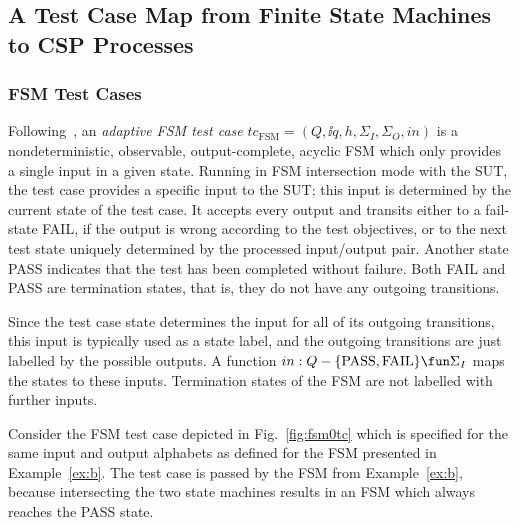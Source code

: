 \subsection{A Test Case Map from Finite State Machines to CSP Processes}
\label{sec:tcmap}

\subsubsection*{FSM Test Cases}

Following~\cite{DBLP:conf/hase/PetrenkoY14}, 
an \emph{adaptive FSM test case} $tc_\text{FSM}=(Q,\ii q,h,\Sigma_I,\Sigma_O,in)$ is a nondeterministic, observable, output-complete, acyclic FSM which only provides a single input in a given state. Running in FSM intersection mode with the SUT, the test case provides a specific input to the SUT; this input is determined by the current state of the test case. It accepts every output and transits either to a fail-state FAIL, if the output is wrong according to the test objectives, or to the next test state uniquely determined  by the processed input/output pair. Another state PASS indicates that
the test has been completed without failure. Both FAIL and PASS are termination states, that is, they do not have any outgoing transitions.

Since the test case state determines the input for all of its outgoing transitions, this input is typically used as a state label, and the outgoing transitions are just labelled by the possible outputs. A function $in : Q -\{  \text{PASS}, \text{FAIL} \} 
\fun\Sigma_I$ maps the states to these inputs. Termination states
of the FSM are not labelled with further inputs.

\begin{example}
Consider the FSM test case depicted in Fig.~\ref{fig:fsm0tc} which is specified
for the same input and output alphabets as defined for  the FSM presented in Example~\ref{ex:b}. The test case is passed by the FSM from Example~\ref{ex:b}, because 
intersecting the two state machines results in an FSM which always reaches the PASS state.
\xbox
\end{example}


